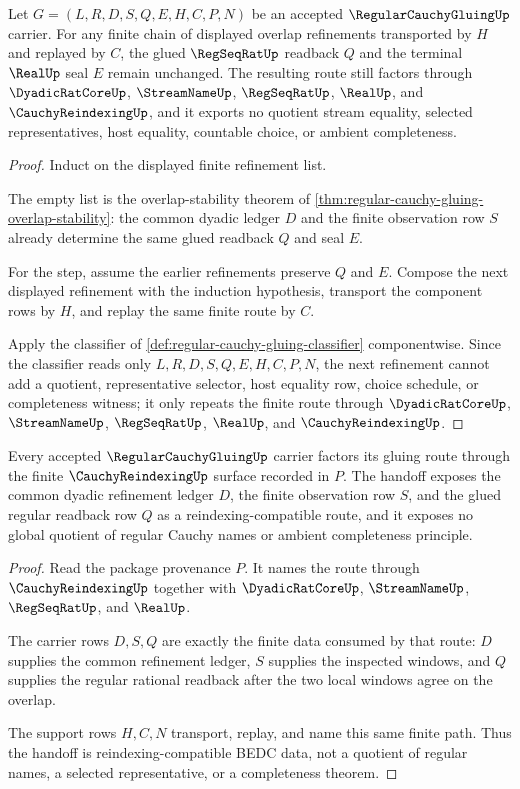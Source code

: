 \begin{theorem}
\label{thm:regular-cauchy-gluing-overlap-induction}
Let $G=(L,R,D,S,Q,E,H,C,P,N)$ be an accepted $\RegularCauchyGluingUp$ carrier. For any finite chain of displayed overlap refinements transported by $H$ and replayed by $C$, the glued $\RegSeqRatUp$ readback $Q$ and the terminal $\RealUp$ seal $E$ remain unchanged. The resulting route still factors through $\DyadicRatCoreUp$, $\StreamNameUp$, $\RegSeqRatUp$, $\RealUp$, and $\CauchyReindexingUp$, and it exports no quotient stream equality, selected representatives, host equality, countable choice, or ambient completeness.
\end{theorem}
\begin{proof}
Induct on the displayed finite refinement list.

The empty list is the overlap-stability theorem of \autoref{thm:regular-cauchy-gluing-overlap-stability}: the common dyadic ledger $D$ and the finite observation row $S$ already determine the same glued readback $Q$ and seal $E$.

For the step, assume the earlier refinements preserve $Q$ and $E$. Compose the next displayed refinement with the induction hypothesis, transport the component rows by $H$, and replay the same finite route by $C$.

Apply the classifier of \autoref{def:regular-cauchy-gluing-classifier} componentwise. Since the classifier reads only $L,R,D,S,Q,E,H,C,P,N$, the next refinement cannot add a quotient, representative selector, host equality row, choice schedule, or completeness witness; it only repeats the finite route through $\DyadicRatCoreUp$, $\StreamNameUp$, $\RegSeqRatUp$, $\RealUp$, and $\CauchyReindexingUp$.
\end{proof}

\begin{theorem}
\label{thm:regular-cauchy-gluing-cauchy-reindexing-handoff}
Every accepted $\RegularCauchyGluingUp$ carrier factors its gluing route through the finite $\CauchyReindexingUp$ surface recorded in $P$. The handoff exposes the common dyadic refinement ledger $D$, the finite observation row $S$, and the glued regular readback row $Q$ as a reindexing-compatible route, and it exposes no global quotient of regular Cauchy names or ambient completeness principle.
\end{theorem}
\begin{proof}
Read the package provenance $P$. It names the route through $\CauchyReindexingUp$ together with $\DyadicRatCoreUp$, $\StreamNameUp$, $\RegSeqRatUp$, and $\RealUp$.

The carrier rows $D,S,Q$ are exactly the finite data consumed by that route: $D$ supplies the common refinement ledger, $S$ supplies the inspected windows, and $Q$ supplies the regular rational readback after the two local windows agree on the overlap.

The support rows $H,C,N$ transport, replay, and name this same finite path. Thus the handoff is reindexing-compatible BEDC data, not a quotient of regular names, a selected representative, or a completeness theorem.
\end{proof}


